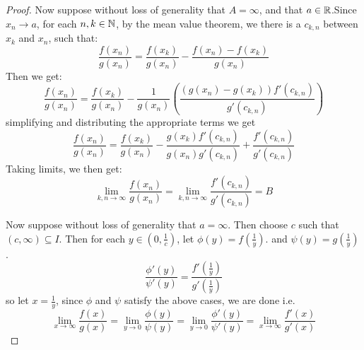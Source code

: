 \begin{proof}
    Now suppose without loss of generality that $A=\infty$, and that  $a \in \mathbb{R}$.Since $x_n \rightarrow a$, 
    for each $n,k \in \mathbb{N}$, by the mean value theorem, we there is a  $c_{k,n}$ between  
    $x_k$ and $x_n$, such that:
        \begin{equation*}
            \frac{f(x_n)}{g(x_n)}=\frac{f(x_k)}{g(x_n)}-\frac{f(x_n)-f(x_k)}{g(x_n)}
        \end{equation*}
    Then we get:
        \begin{equation*}
            \frac{f(x_n)}{g(x_n)}=\frac{f(x_k)}{g(x_n)}-\frac{1}{g(x_n)}
                                (\frac{(g(x_n)-g(x_k))f'(c_{k,n})}{g'(c_{k,n})})
        \end{equation*}
    simplifying and distributing the appropriate terms we get
        \begin{equation*}
            \frac{f(x_n)}{g(x_n)}=\frac{f(x_k)}{g(x_n)}-\frac{g(x_k)f'(c_{k,n})}{g(x_n)g'(c_{k,n})}
            +\frac{f'(c_{k,n})}{g'(c_{k,n})}
        \end{equation*} 
    Taking limits, we then get:
        \begin{equation*}
            \lim_{k,n \rightarrow \infty}{\frac{f(x_n)}{g(x_n)}}=
            \lim_{k,n \rightarrow \infty}{\frac{f'(c_{k,n})}{g'(c_{k,n})}}=B
        \end{equation*}
    
    Now suppose without loss of generality that $a = \infty$. Then choose $c$ such that 
    $(c,\infty) \subseteq I$. Then for each  $y \in (0,\frac{1}{c})$, let $\phi(y)=f(\frac{1}{y})$. 
    and $\psi(y)=g(\frac{1}{y})$. 
        \begin{equation*}
            \frac{\phi'(y)}{\psi'(y)}=\frac{f'(\frac{1}{y})}{g'(\frac{1}{y})}
        \end{equation*}
    so let $x=\frac{1}{y}$, since $\phi$ and  $\psi$ satisfy the above cases, we are done i.e.
        \begin{equation*}
            \lim_{x \rightarrow \infty}{\frac{f(x)}{g(x)}}=
            \lim_{y \rightarrow 0}{\frac{\phi(y)}{\psi(y)}}=
            \lim_{y \rightarrow 0}{\frac{\phi'(y)}{\psi'(y)}}=
            \lim_{x \rightarrow \infty}{\frac{f'(x)}{g'(x)}}
        \end{equation*} 
\end{proof}

